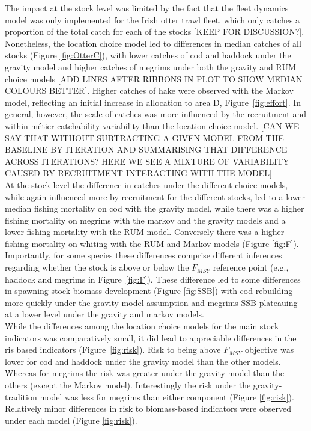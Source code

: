 \documentclass[12pt, halfline, a4paper]{ouparticle}
\begin{document}
The impact at the stock level was limited by the fact that the fleet dynamics
model was only implemented for the Irish otter trawl fleet, which only catches
a proportion of the total catch for each of the stocks [KEEP FOR DISCUSSION?]. Nonetheless, the
location choice model led to differences in median catches of all stocks
(Figure \ref{fig:OtterC}), with lower catches of cod and haddock under the
gravity model and higher catches of megrims under both the gravity and RUM
choice models [ADD LINES AFTER RIBBONS IN PLOT TO SHOW MEDIAN COLOURS BETTER]. Higher catches of hake were observed with the Markov
model, reflecting an initial increase in allocation to area D, Figure~\ref{fig:effort}. In general, however, the scale of catches was more influenced by the recruitment and within métier catchability variability than the location choice
model. [CAN WE SAY THAT WITHOUT SUBTRACTING A GIVEN MODEL FROM THE BASELINE BY ITERATION AND SUMMARISING THAT DIFFERENCE ACROSS ITERATIONS? HERE WE SEE A MIXTURE OF VARIABILITY CAUSED BY RECRUITMENT INTERACTING WITH THE MODEL]\\

At the stock level the difference in catches under the different choice models,
while again influenced more by recruitment for the different stocks, led to a
lower median fishing mortality on cod with the gravity model, while there was a
higher fishing mortality on megrims with the markov and the gravity models and
a lower fishing mortality with the RUM model. Conversely there was a higher
fishing mortality on whiting with the RUM and Markov models (Figure
\ref{fig:F}). Importantly, for some species these differences comprise different inferences regarding whether the stock is above or below the $F_{MSY}$ reference point (e.g., haddock and megrims in Figure~\ref{fig:F}). These difference led to some differences in spawning stock
biomass development (Figure \ref{fig:SSB}) with cod rebuilding more quickly
under the gravity model assumption and megrims SSB plateauing at a lower level
under the gravity and markov models. \\

While the differences among the location choice models for the main stock
indicators was comparatively small, it did lead to appreciable differences in the ris based indicators (Figure~\ref{fig:risk}). Risk to being above $F_{MSY}$ objective was lower for cod and haddock under the gravity model than the other models. Whereas for megrims the risk was greater under the gravity model than the others (except the Markov model). Interestingly the risk under the gravity-tradition model was less for megrims than either component (Figure \ref{fig:risk}). Relatively minor differences in risk to biomass-based indicators were observed under each model (Figure \ref{fig:risk}).
\end{document}
